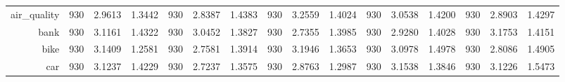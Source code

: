 \begin{table}[htbp]
{\begin{tabular}{rccccccccccccccc}
			air\_quality                        & 930                                     & 2.9613                                                                    & 1.3442          & 930                            & \cellcolor[rgb]{ .776,  .937,  .808}\textcolor[rgb]{ 0,  .38,  0}{2.8387} & 1.4383          & 930                             & 3.2559                                                                             & 1.4024          & 930                             & 3.0538                                                                    & 1.4200          & 930                             & 2.8903                                                                    & 1.4297          \\
			bank                                & 930                                     & 3.1161                                                                    & 1.4322          & 930                            & 3.0452                                                                    & 1.3827          & 930                             & \cellcolor[rgb]{ .776,  .937,  .808}\textcolor[rgb]{ 0,  .38,  0}{2.7355}          & 1.3985          & 930                             & 2.9280                                                                    & 1.4028          & 930                             & 3.1753                                                                    & 1.4151          \\
			bike                                & 930                                     & 3.1409                                                                    & 1.2581          & 930                            & \cellcolor[rgb]{ .776,  .937,  .808}\textcolor[rgb]{ 0,  .38,  0}{2.7581} & 1.3914          & 930                             & 3.1946                                                                             & 1.3653          & 930                             & 3.0978                                                                    & 1.4978          & 930                             & 2.8086                                                                    & 1.4905          \\
			car                                 & 930                                     & 3.1237                                                                    & 1.4229          & 930                            & \cellcolor[rgb]{ .776,  .937,  .808}\textcolor[rgb]{ 0,  .38,  0}{2.7237} & 1.3575          & 930                             & 2.8763                                                                             & 1.2987          & 930                             & 3.1538                                                                    & 1.3846          & 930                             & 3.1226                                                                    & 1.5473          \\

\end{tabular}}
\end{table}
